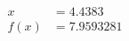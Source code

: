 \documentclass[preview]{standalone}
\begin{document}
\begin{align*}
x &= 4.4383\\f(x) &= 7.9593281
\end{align*}
\end{document}
